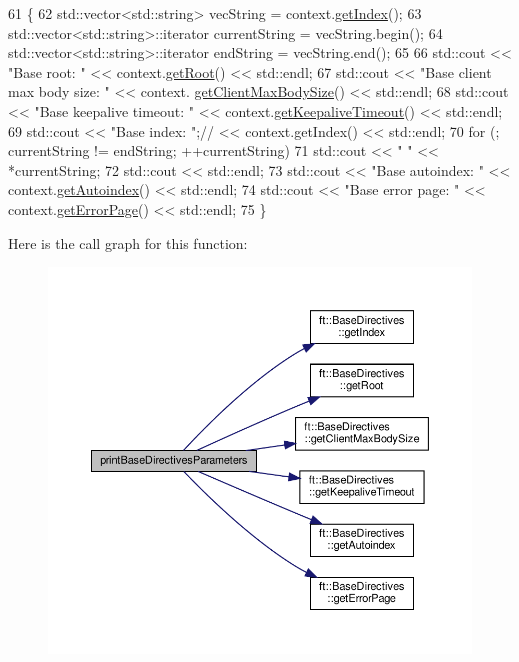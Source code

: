 \begin{DoxyCode}
61     \{
62         std::vector<std::string>        vecString = context.\hyperlink{classft_1_1_base_directives_a018f34a5ffd66e891494b5c0ee69177b}{getIndex}();
63         std::vector<std::string>::iterator  currentString = vecString.begin();
64         std::vector<std::string>::iterator      endString = vecString.end();
65 
66         std::cout << \textcolor{stringliteral}{"Base root: "} << context.\hyperlink{classft_1_1_base_directives_aa5dbcb08bda0a0e7e502d2df7cf64287}{getRoot}() << std::endl;
67         std::cout << \textcolor{stringliteral}{"Base client max body size: "} << context.
      \hyperlink{classft_1_1_base_directives_a930398ba1e4b99b2ba01a60dcda0c923}{getClientMaxBodySize}() << std::endl;
68         std::cout << \textcolor{stringliteral}{"Base keepalive timeout: "} << context.\hyperlink{classft_1_1_base_directives_ab8574338758f65325cab5d1c394826c8}{getKeepaliveTimeout}() << 
      std::endl;
69         std::cout << \textcolor{stringliteral}{"Base index: "};\textcolor{comment}{// << context.getIndex() << std::endl;}
70         \textcolor{keywordflow}{for} (; currentString != endString; ++currentString)
71             std::cout << \textcolor{stringliteral}{" "} << *currentString;
72         std::cout << std::endl;
73         std::cout << \textcolor{stringliteral}{"Base autoindex: "} << context.\hyperlink{classft_1_1_base_directives_a4c11ed7ad76aeac228b029a2444de568}{getAutoindex}() << std::endl;
74         std::cout << \textcolor{stringliteral}{"Base error page: "} << context.\hyperlink{classft_1_1_base_directives_a3cb0c21f17781de392d5ee09d7190caf}{getErrorPage}() << std::endl;
75     \}
\end{DoxyCode}
Here is the call graph for this function\+:
\nopagebreak
\begin{figure}[H]
\begin{center}
\leavevmode
\includegraphics[width=350pt]{namespaceft_af12105e484dbac115fe1d6a4ff074f27_cgraph}
\end{center}
\end{figure}
